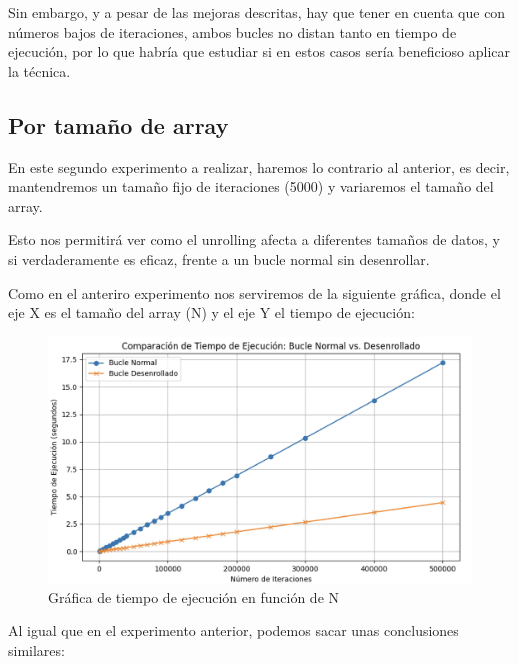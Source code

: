 \documentclass[a4paper,twocolumn]{article}
\begin{document}
Sin embargo, y a pesar de las mejoras descritas, hay que tener en cuenta que con números bajos de iteraciones, ambos bucles no distan tanto en tiempo de ejecución, por lo que habría que estudiar si en estos casos sería beneficioso aplicar la técnica.

\subsection{Por tamaño de array}

En este segundo experimento a realizar, haremos lo contrario al anterior, es decir, mantendremos un tamaño fijo de iteraciones (5000) y variaremos el tamaño del array.

Esto nos permitirá ver como el unrolling afecta a diferentes tamaños de datos, y si verdaderamente es eficaz, frente a un bucle normal sin desenrollar.

Como en el anteriro experimento nos serviremos de la siguiente gráfica, donde el eje X es el tamaño del array (N) y el eje Y el tiempo de ejecución:


\begin{figure}[H]
    \centering
    \includegraphics[width=\columnwidth]{img/arrayTam.jpg}
    \caption{Gráfica de tiempo de ejecución en función de N}
    \label{fig:iter}
\end{figure}

Al igual que en el experimento anterior, podemos sacar unas conclusiones similares:
\end{document}
